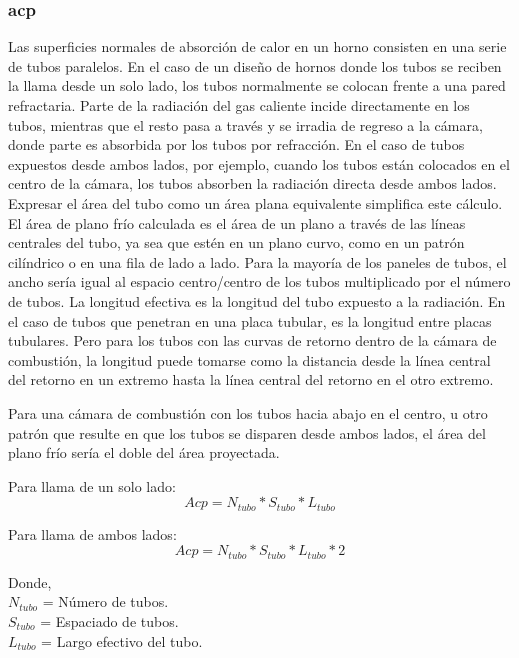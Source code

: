 \subsubsection{\ac{acp}}

\par Las superficies normales de absorción de calor en un horno consisten en una serie de tubos paralelos. En el caso de un diseño de hornos donde los tubos se reciben la llama desde un solo lado, los tubos normalmente se colocan frente a una pared refractaria. Parte de la radiación del gas caliente incide directamente en los tubos, mientras que el resto pasa a través y se irradia de regreso a la cámara, donde parte es absorbida por los tubos por refracción. En el caso de tubos expuestos desde ambos lados, por ejemplo, cuando los tubos están colocados en el centro de la cámara, los tubos absorben la radiación directa desde ambos lados. Expresar el área del tubo como un área plana equivalente simplifica este cálculo. El área de plano frío calculada es el área de un plano a través de las líneas centrales del tubo, ya sea que estén en un plano curvo, como en un patrón cilíndrico o en una fila de lado a lado. Para la mayoría de los paneles de tubos, el ancho sería igual al espacio centro/centro de los tubos multiplicado por el número de tubos. La longitud efectiva es la longitud del tubo expuesto a la radiación. En el caso de tubos que penetran en una placa tubular, es la longitud entre placas tubulares. Pero para los tubos con las curvas de retorno dentro de la cámara de combustión, la longitud puede tomarse como la distancia desde la línea central del retorno en un extremo hasta la línea central del retorno en el otro extremo.

\par Para una cámara de combustión con los tubos hacia abajo en el centro, u otro patrón que resulte en que los tubos se disparen desde ambos lados, el área del plano frío sería el doble del área proyectada.

\par Para llama de un solo lado:
\begin{equation}
Acp = N_{tubo} * S_{tubo} * L_{tubo}
\end{equation}
\par Para llama de ambos lados:
\begin{equation*}
Acp = N_{tubo} * S_{tubo} * L_{tubo} * 2
\end{equation*}
\par Donde, \\
$N_{tubo}$ = Número de tubos. \\
$S_{tubo}$ = Espaciado de tubos. \\
$L_{tubo}$ = Largo efectivo del tubo.

